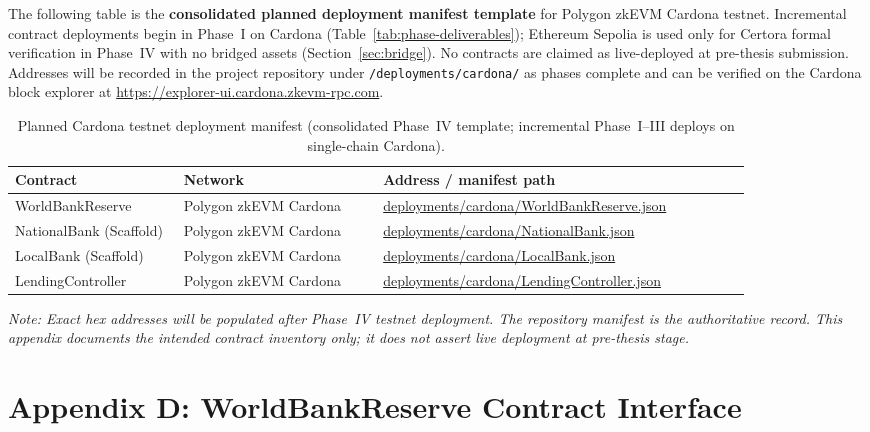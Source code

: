 \documentclass[12pt,a4paper]{report}
\newcommand{\tableheadcolor}{\rowcolor{TableHeadBg}}
\newcommand{\tableheadfont}{\bfseries}
\begin{document}
The following table is the \textbf{consolidated planned deployment manifest template} for Polygon zkEVM Cardona testnet. Incremental contract deployments begin in Phase~I on Cardona (Table~\ref{tab:phase-deliverables}); Ethereum Sepolia is used only for Certora formal verification in Phase~IV with no bridged assets (Section~\ref{sec:bridge}). No contracts are claimed as live-deployed at pre-thesis submission. Addresses will be recorded in the project repository under \texttt{/deployments/cardona/} as phases complete and can be verified on the Cardona block explorer at \url{https://explorer-ui.cardona.zkevm-rpc.com}.

\begin{table}[H]
\centering
\caption[Planned Cardona testnet deployment manifest]{Planned Cardona testnet deployment manifest (consolidated Phase~IV template; incremental Phase~I--III deploys on single-chain Cardona).}
\label{tab:cardona-manifest}
\begingroup
\footnotesize
\setlength{\tabcolsep}{4pt}
\renewcommand{\arraystretch}{1.15}
\begin{tabular}{@{}%
  >{\raggedright\arraybackslash}p{0.22\linewidth}%
  >{\raggedright\arraybackslash}p{0.26\linewidth}%
  >{\raggedright\arraybackslash}p{0.48\linewidth}@{}}
\toprule
\tableheadcolor
\tableheadfont Contract & \tableheadfont Network & \tableheadfont Address / manifest path \\
\midrule
WorldBankReserve & Polygon zkEVM Cardona & \url{deployments/cardona/WorldBankReserve.json} \\
\rowcolor{RowShade}
NationalBank (Scaffold) & Polygon zkEVM Cardona & \url{deployments/cardona/NationalBank.json} \\
LocalBank (Scaffold) & Polygon zkEVM Cardona & \url{deployments/cardona/LocalBank.json} \\
\rowcolor{RowShade}
LendingController & Polygon zkEVM Cardona & \url{deployments/cardona/LendingController.json} \\
\bottomrule
\end{tabular}
\endgroup
\end{table}

\noindent\textit{Note: Exact hex addresses will be populated after Phase~IV testnet deployment. The repository manifest is the authoritative record. This appendix documents the intended contract inventory only; it does not assert live deployment at pre-thesis stage.}


\chapter*{Appendix D: WorldBankReserve Contract Interface}
{}
\end{document}
